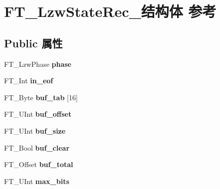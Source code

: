 \hypertarget{struct_f_t___lzw_state_rec__}{}\section{F\+T\+\_\+\+Lzw\+State\+Rec\+\_\+结构体 参考}
\label{struct_f_t___lzw_state_rec__}
\subsection*{Public 属性}
\begin{DoxyCompactItemize}
\item 
\mbox{\label{struct_f_t___lzw_state_rec___a35e3822c3bd5fd64f575d17b66f653be}} 
F\+T\+\_\+\+Lzw\+Phase {\bfseries phase}
\item 
\mbox{\label{struct_f_t___lzw_state_rec___a7e9f42aaec77c4629129d2f06ca7cc35}} 
F\+T\+\_\+\+Int {\bfseries in\+\_\+eof}
\item 
\mbox{\label{struct_f_t___lzw_state_rec___a8babbb6feb2d3e53cbf3259cfced1d69}} 
F\+T\+\_\+\+Byte {\bfseries buf\+\_\+tab} \mbox{[}16\mbox{]}
\item 
\mbox{\label{struct_f_t___lzw_state_rec___a383f245c92d43dab15cb133dfb6b72fb}} 
F\+T\+\_\+\+U\+Int {\bfseries buf\+\_\+offset}
\item 
\mbox{\label{struct_f_t___lzw_state_rec___a46b0115335b9e989f94eaf29a4b86fed}} 
F\+T\+\_\+\+U\+Int {\bfseries buf\+\_\+size}
\item 
\mbox{\label{struct_f_t___lzw_state_rec___ac775dec247e97d7b11eb2570d94f6a60}} 
F\+T\+\_\+\+Bool {\bfseries buf\+\_\+clear}
\item 
\mbox{\label{struct_f_t___lzw_state_rec___a5903a4e2858a0b03b2fd5479aace3e4f}} 
F\+T\+\_\+\+Offset {\bfseries buf\+\_\+total}
\item 
\mbox{\label{struct_f_t___lzw_state_rec___a0d78b2dfa9324612b520a00f08fd7316}} 
F\+T\+\_\+\+U\+Int {\bfseries max\+\_\+bits}

\end{DoxyCompactItemize}
